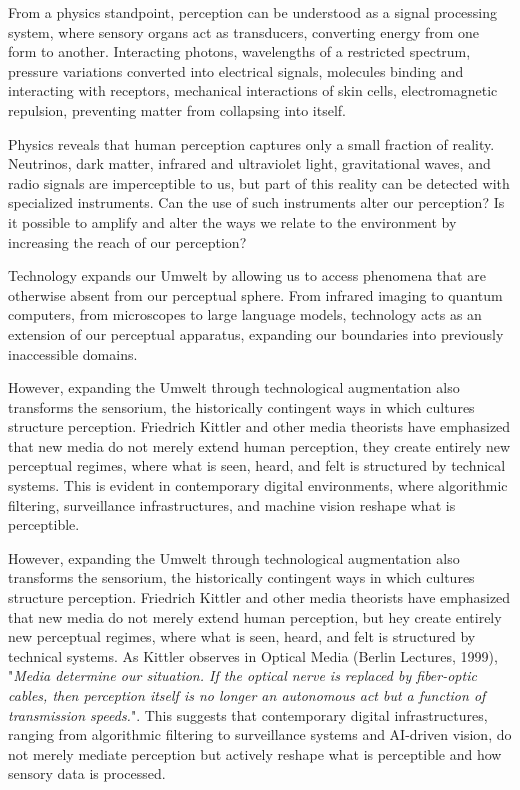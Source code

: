 From a physics standpoint, perception can be understood as a signal processing system, where sensory organs act as transducers, converting energy from one form to another. Interacting photons, wavelengths of a restricted spectrum, pressure variations converted into electrical signals, molecules binding and interacting with receptors, mechanical interactions of skin cells, electromagnetic repulsion, preventing matter from collapsing into itself.

Physics reveals that human perception captures only a small fraction of reality. Neutrinos, dark matter, infrared and ultraviolet light, gravitational waves, and radio signals are imperceptible to us, but part of this reality can be detected with specialized instruments. Can the use of such instruments alter our perception? Is it possible to amplify and alter the ways we relate to the environment by increasing the reach of our perception?

Technology expands our Umwelt by allowing us to access phenomena that are otherwise absent from our perceptual sphere. From infrared imaging to quantum computers, from microscopes to large language models, technology acts as an extension of our perceptual apparatus, expanding our boundaries into previously inaccessible domains.

However, expanding the Umwelt through technological augmentation also transforms the sensorium, the historically contingent ways in which cultures structure perception. Friedrich Kittler and other media theorists have emphasized that new media do not merely extend human perception, they create entirely new perceptual regimes, where what is seen, heard, and felt is structured by technical systems. This is evident in contemporary digital environments, where algorithmic filtering, surveillance infrastructures, and machine vision reshape what is perceptible.

However, expanding the Umwelt through technological augmentation also transforms the sensorium, the historically contingent ways in which cultures structure perception. Friedrich Kittler and other media theorists have emphasized that new media do not merely extend human perception, but hey create entirely new perceptual regimes, where what is seen, heard, and felt is structured by technical systems. As Kittler observes in Optical Media (Berlin Lectures, 1999), "\textit{Media determine our situation. If the optical nerve is replaced by fiber-optic cables, then perception itself is no longer an autonomous act but a function of transmission speeds.}"\citep{kittler1999}. This suggests that contemporary digital infrastructures, ranging from algorithmic filtering to surveillance systems and AI-driven vision, do not merely mediate perception but actively reshape what is perceptible and how sensory data is processed.

